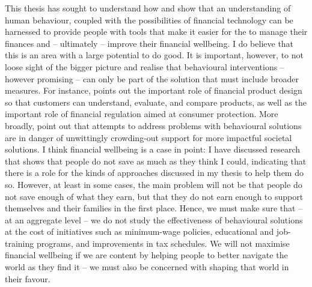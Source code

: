 This thesis has sought to understand how and show that an understanding of
human behaviour, coupled with the possibilities of financial technology can be
harnessed to provide people with tools that make it easier for the to manage
their finances and -- ultimately -- improve their financial wellbeing. I do
believe that this is an area with a large potential to do good. It is
important, however, to not loose sight of the bigger picture and realise that
behavioural interventions -- however promising -- can only be part of the
solution that must include broader measures. For instance,
\citet{agarwal2017shapes} points out the important role of financial product
design so that customers can understand, evaluate, and compare products, as
well as the important role of financial regulation aimed at consumer
protection. More broadly, \citet{chater2022frame} point out that attempts to
address problems with behavioural solutions are in danger of unwittingly
crowding-out support for more impactful societal solutions. I think financial
wellbeing is a case in point: I have discussed research that shows that people
do not save as much as they think I could, indicating that there is a role for
the kinds of approaches discussed in my thesis to help them do so. However, at
least in some cases, the main problem will not be that people do not save
enough of what they earn, but that they do not earn enough to support
themselves and their families in the first place. Hence, we must make sure that
-- at an aggregate level -- we do not study the effectiveness of behavioural
solutions at the cost of initiatives such as minimum-wage policies, educational
and job-training programs, and improvements in tax schedules. We will not
maximise financial wellbeing if we are content by helping people to better
navigate the world as they find it -- we must also be concerned with shaping
that world in their favour.

